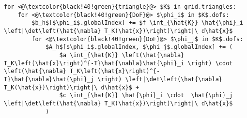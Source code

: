 \documentclass{article}
\begin{document}
\pagestyle{plain}
\lstset{language=Python}
\begin{lstlisting}[mathescape=true]
for <@\textcolor{black!40!green}{triangle}@> $K$ in grid.triangles:
	for <@\textcolor{black!40!green}{DoF}@> $\phi_i$ in $K$.dofs:
		$b_h$[$\phi_i$.globalIndex] += $f \int_{\hat{K}} \hat{\phi}_i \left|\det\left(\hat{\nabla} T_K(\hat{x})\right)\right|\ d\hat{x}$
		for <@\textcolor{black!40!green}{DoF}@> $\phi_j$ in $K$.dofs:
			$A_h$[$\phi_i$.globalIndex, $\phi_j$.globalIndex] += (
				$a \int_{\hat{K}} \left(\hat{\nabla} T_K\left(\hat{x}\right)^{-T}\hat{\nabla}\hat{\phi}_i \right) \cdot \left(\hat{\nabla} T_K\left(\hat{x}\right)^{-T}\hat{\nabla}\hat{\phi}_j \right) \left|\det\left(\hat{\nabla} T_K(\hat{x})\right)\right|\ d\hat{x}$ +
				$c \int_{\hat{K}} \hat{\phi}_i \cdot  \hat{\phi}_j \left|\det\left(\hat{\nabla} T_K(\hat{x})\right)\right|\ d\hat{x}$
			)
\end{lstlisting}
\end{document}
